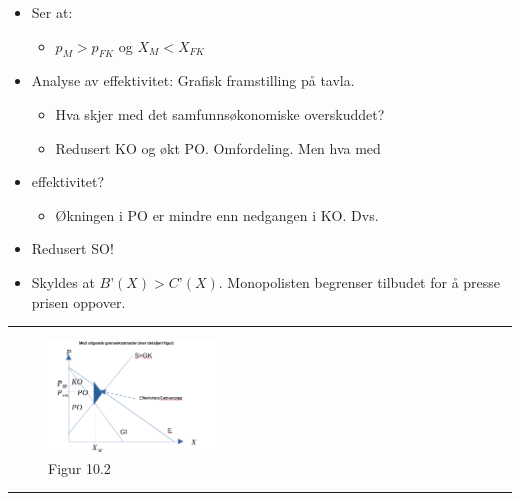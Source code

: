 \documentclass[
  letterpaper,
  DIV=11,
  numbers=noendperiod]{scrartcl}
\providecommand{\tightlist}{%
  \setlength{\itemsep}{0pt}\setlength{\parskip}{0pt}}\usepackage{longtable,booktabs,array}
\begin{document}
\begin{itemize}
\tightlist
\item
  Ser at:

  \begin{itemize}
  \tightlist
  \item
    \(p_M > p_{FK}\) og \(X_{M} < X_{FK}\)
  \end{itemize}
\item
  Analyse av effektivitet: Grafisk framstilling på tavla.

  \begin{itemize}
  \tightlist
  \item
    Hva skjer med det samfunnsøkonomiske overskuddet?
  \item
    Redusert KO og økt PO. Omfordeling. Men hva med
  \end{itemize}
\item
  effektivitet?

  \begin{itemize}
  \tightlist
  \item
    Økningen i PO er mindre enn nedgangen i KO. Dvs.
  \end{itemize}
\item
  Redusert SO!
\item
  Skyldes at \(B’(X) > C’(X)\). Monopolisten begrenser tilbudet for å
  presse prisen oppover.
\end{itemize}

\begin{center}\rule{0.5\linewidth}{0.5pt}\end{center}

\begin{figure}[H]

{\centering \includegraphics[width=0.4\textwidth,height=\textheight]{drawio/monop.png}

}

\caption{Figur 10.2}

\end{figure}%

\begin{center}\rule{0.5\linewidth}{0.5pt}\end{center}
\end{document}
